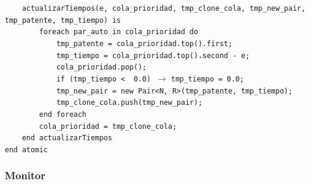 \documentclass[12pt]{article}
\begin{document}
\begin{tcolorbox}[
    colback=black!5!white,
    colframe=black!80!white,
    boxrule=0.8pt,
    arc=2pt,
    left=5pt,
    right=5pt,
    top=5pt,
    bottom=5pt,
    fontupper=\ttfamily,
    breakable
]
\begin{flushleft}
\begin{flushleft}
\texttt{~~~~actualizarTiempos(e, cola\_prioridad, tmp\_clone\_cola, tmp\_new\_pair, tmp\_patente, tmp\_tiempo) is}\\
\texttt{~~~~~~~~foreach par\_auto in cola\_prioridad do}\\
\texttt{~~~~~~~~~~~~tmp\_patente = cola\_prioridad.top().first;}\\
\texttt{~~~~~~~~~~~~tmp\_tiempo = cola\_prioridad.top().second - e;}\\
\texttt{~~~~~~~~~~~~cola\_prioridad.pop();}\\
\texttt{~~~~~~~~~~~~if (tmp\_tiempo < \ 0.0) }\(\rightarrow\) \texttt{tmp\_tiempo = 0.0;} \\
\texttt{~~~~~~~~~~~~tmp\_new\_pair = new Pair<N, R>(tmp\_patente, tmp\_tiempo);}\\
\texttt{~~~~~~~~~~~~tmp\_clone\_cola.push(tmp\_new\_pair);}\\
\texttt{~~~~~~~~end foreach}\\
\texttt{~~~~~~~~cola\_prioridad = tmp\_clone\_cola;}\\
\texttt{~~~~end actualizarTiempos}\\[5pt]

\texttt{end atomic}
\end{flushleft}

\end{flushleft}
\end{tcolorbox}


\subsubsection{Monitor}
\end{document}
